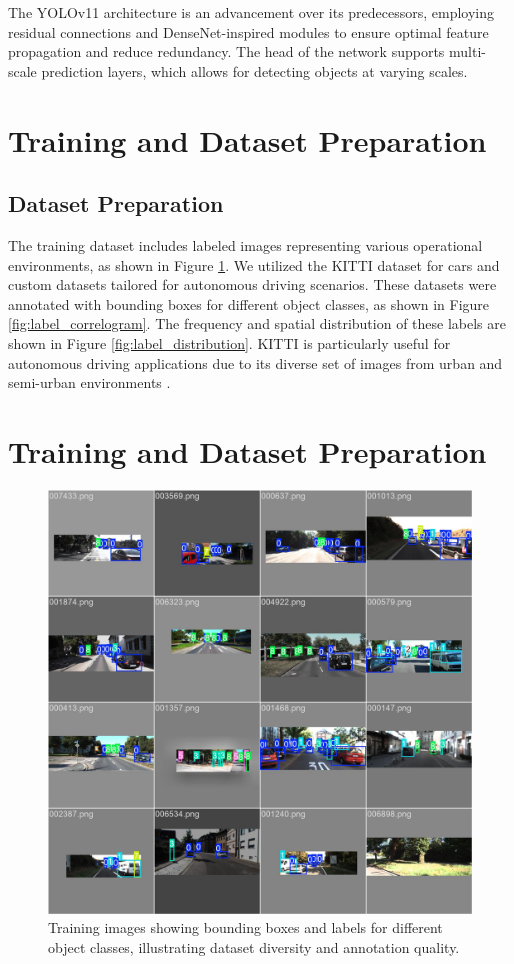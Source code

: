 \documentclass[12pt]{article}
\begin{document}
The YOLOv11 architecture is an advancement over its predecessors, employing residual connections and DenseNet-inspired modules to ensure optimal feature propagation and reduce redundancy. The head of the network supports multi-scale prediction layers, which allows for detecting objects at varying scales.

\section{Training and Dataset Preparation}

\subsection{Dataset Preparation}
The training dataset includes labeled images representing various operational environments, as shown in Figure \ref{fig:training_dataset}. We utilized the KITTI dataset for cars and custom datasets tailored for autonomous driving scenarios. These datasets were annotated with bounding boxes for different object classes, as shown in Figure \ref{fig:label_correlogram}. The frequency and spatial distribution of these labels are shown in Figure \ref{fig:label_distribution}. KITTI is particularly useful for autonomous driving applications due to its diverse set of images from urban and semi-urban environments \cite{xu2022real}.

\section{Training and Dataset Preparation}

\begin{figure}[h]
    \centering
    \includegraphics[width=\textwidth]{images/train_batch16842.jpg}
    \caption{Training images showing bounding boxes and labels for different object classes, illustrating dataset diversity and annotation quality.}
    \label{fig:training_dataset}
\end{figure}
\end{document}
